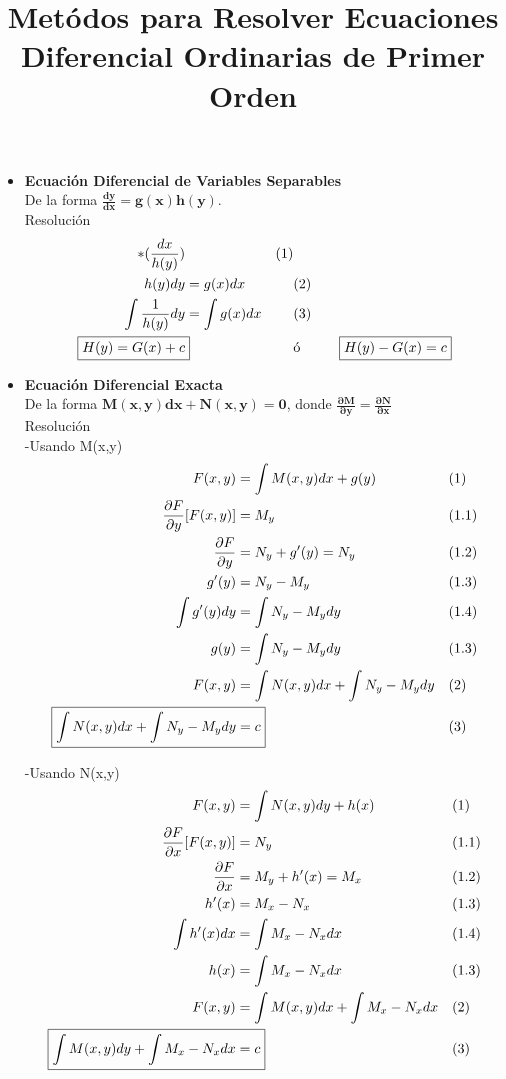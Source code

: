 \documentclass{article}
\title{Metódos para Resolver Ecuaciones Diferencial Ordinarias de Primer Orden}
\begin{document}
\maketitle

\begin{itemize}
    \item \textbf{Ecuación Diferencial de Variables Separables} \\
    De la forma $\boldsymbol{\frac{dy}{dx} = g(x)h(y)}$. \\
    Resolución
    \begin{align*}
        [ \frac{dy}{dx} & = g(x)h(y) ]*(\frac{dx}{h(y)}) &&\text{(1)}\\
        h(y)dy & = g(x)dx &&\text{(2)}\\
        \int \frac{1}{h(y)} dy & = \int g(x)dx &&\text{(3)}\\
        \Aboxed{ H(y) = G(x) + c } &&\text{ó} && \Aboxed{ H(y) - G(x) = c }
    \end{align*}
    
    \item \textbf{Ecuación Diferencial Exacta} \\
    De la forma $\boldsymbol{M(x,y)dx + N(x,y) = 0}$, donde 
    \textbf{$\boldsymbol{\frac{\partial M}{\partial y} = \frac{\partial N}{\partial x}}$} \\
    Resolución \\
    -Usando M(x,y)
    \begin{align*}
        F(x,y) & = \int M(x,y) dx + g(y) &&\text{(1)}\\
        \frac{\partial F}{\partial y}[F(x,y)] & = M_y &&\text{(1.1)}\\
        \frac{\partial F}{\partial y} & = N_y + g'(y) = N_y &&\text{(1.2)}\\
        g'(y) & = N_y - M_y &&\text{(1.3)}\\
        \int g'(y) dy & = \int N_y - M_y dy &&\text{(1.4)}\\
        g(y) & = \int N_y - M_y dy &&\text{(1.3)}\\
        F(x,y) & = \int N(x,y) dx + \int N_y - M_y dy &&\text{(2)}\\
        \Aboxed{ \int N(x,y) dx + \int N_y - M_y dy & = c } &&\text{(3)}
    \end{align*}

    -Usando N(x,y)
    \begin{align*}
        F(x,y) & = \int N(x,y) dy + h(x) &&\text{(1)}\\
        \frac{\partial F}{\partial x}[F(x,y)] & = N_y &&\text{(1.1)}\\
        \frac{\partial F}{\partial x} & = M_y + h'(x) = M_x &&\text{(1.2)}\\
        h'(x) & = M_x - N_x &&\text{(1.3)}\\
        \int h'(x) dx & = \int M_x - N_x dx &&\text{(1.4)}\\
        h(x) & = \int M_x - N_x dx &&\text{(1.3)}\\
        F(x,y) & = \int M(x,y) dx + \int M_x - N_x dx &&\text{(2)}\\
        \Aboxed{ \int M(x,y) dy + \int M_x - N_x dx & = c } &&\text{(3)}
    \end{align*}


\end{itemize}
\end{document}
